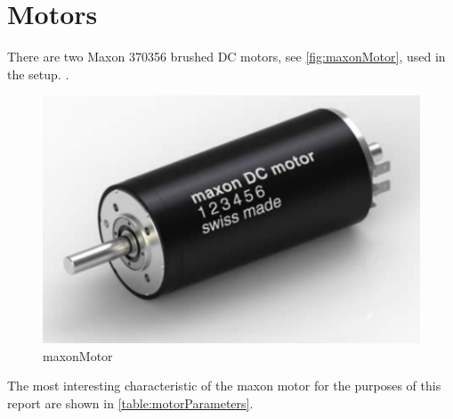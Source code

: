 %
\section{Motors}\label{sec:motors}
There are two Maxon 370356 brushed DC motors, see \autoref{fig:maxonMotor}, used in the setup. .


\begin{figure}[H]
  \includegraphics[width=.26\textwidth]{figures/maxonMotor}
  \caption{maxonMotor}
  \label{fig:maxonMotor}
\end{figure}

The most interesting characteristic of the maxon motor for the purposes of this report are shown in \autoref{table:motorParameters}.

